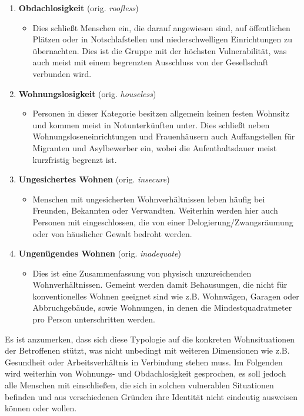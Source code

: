 \begin{enumerate}
	\item \textbf{Obdachlosigkeit} (orig. \textit{roofless})
	\begin{itemize}
		\item[] Dies schließt Menschen ein, die darauf angewiesen sind, auf öffentlichen Plätzen oder in Notschlafstellen und niederschwelligen Einrichtungen zu übernachten. Dies ist die Gruppe mit der höchsten Vulnerabilität, was auch meist mit einem begrenzten Ausschluss von der Gesellschaft verbunden wird.
	\end{itemize}
	\item \textbf{Wohnungslosigkeit} (orig. \textit{houseless})
		\begin{itemize}
			\item[] Personen in dieser Kategorie besitzen allgemein keinen festen Wohnsitz und kommen meist in Notunterkünften unter. Dies schließt neben Wohnungsloseneinrichtungen und Frauenhäusern auch Auffangstellen für Migranten und Asylbewerber ein, wobei die Aufenthaltsdauer meist kurzfristig begrenzt ist.
		\end{itemize}
		\newpage
	\item \textbf{Ungesichertes Wohnen} (orig. \textit{insecure})
		\begin{itemize}
			\item[] Menschen mit ungesicherten Wohnverhältnissen leben häufig bei Freunden, Bekannten oder Verwandten. Weiterhin werden hier auch Personen mit eingeschlossen, die von einer Delogierung/Zwangsräumung oder von häuslicher Gewalt bedroht werden.
		\end{itemize}
	\item \textbf{Ungenügendes Wohnen} (orig. \textit{inadequate})
		\begin{itemize}
			\item[] Dies ist eine Zusammenfassung von physisch unzureichenden Wohnverhältnissen. Gemeint werden damit Behausungen, die nicht für konventionelles Wohnen geeignet sind wie z.B. Wohnwägen, Garagen oder Abbruchgebäude, sowie Wohnungen, in denen die Mindestquadratmeter pro Person unterschritten werden.
		\end{itemize}
\end{enumerate}

Es ist anzumerken, dass sich diese Typologie auf die konkreten Wohnsituationen der Betroffenen stützt, was nicht unbedingt mit weiteren Dimensionen wie z.B. Gesundheit oder Arbeitsverhältnis in Verbindung stehen muss. Im Folgenden wird weiterhin von Wohnungs- und Obdachlosigkeit gesprochen, es soll jedoch alle Menschen mit einschließen, die sich in solchen vulnerablen Situationen befinden und aus verschiedenen Gründen ihre Identität nicht eindeutig ausweisen können oder wollen.


